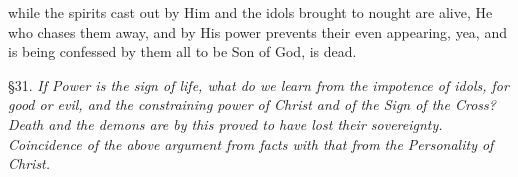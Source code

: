 while the spirits cast out by Him and the idols brought to nought are alive, He who chases them away, and by His power prevents their even appearing, yea, and is being confessed by them all to be Son of God, is dead.


§31. \emph{If Power is the sign of life, what do we learn from the impotence of idols, for good or evil, and the constraining power of Christ and of the Sign of the Cross? Death and the demons are by this proved to have lost their sovereignty. Coincidence of the above argument from facts with that from the Personality of Christ.}


